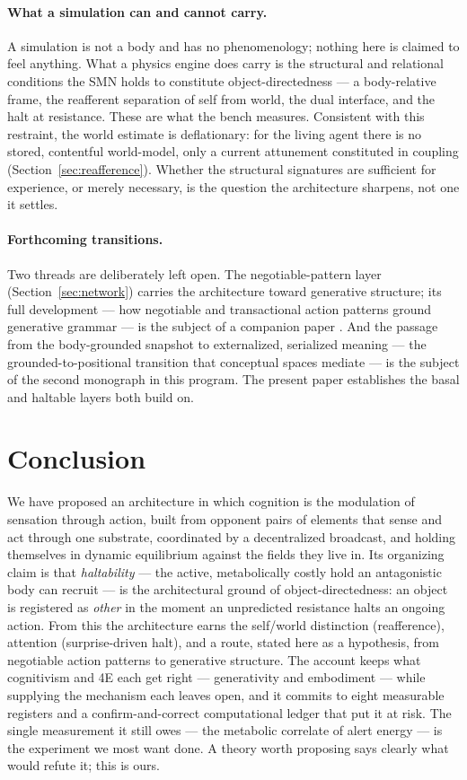 \documentclass[utf8]{FrontiersinHarvard}
\begin{document}
\paragraph{What a simulation can and cannot carry.} A simulation is not a body and has no phenomenology; nothing here is claimed to feel anything. What a physics engine does carry is the structural and relational conditions the SMN holds to constitute object-directedness --- a body-relative frame, the reafferent separation of self from world, the dual interface, and the halt at resistance. These are what the bench measures. Consistent with this restraint, the world estimate is deflationary: for the living agent there is no stored, contentful world-model, only a current attunement constituted in coupling (Section~\ref{sec:reafference}). Whether the structural signatures are sufficient for experience, or merely necessary, is the question the architecture sharpens, not one it settles.

\paragraph{Forthcoming transitions.} Two threads are deliberately left open. The negotiable-pattern layer (Section~\ref{sec:network}) carries the architecture toward generative structure; its full development --- how negotiable and transactional action patterns ground generative grammar --- is the subject of a companion paper \citep{NagarjunaKarnamNAPprep}. And the passage from the body-grounded snapshot to externalized, serialized meaning --- the grounded-to-positional transition that conceptual spaces mediate --- is the subject of the second monograph in this program. The present paper establishes the basal and haltable layers both build on.

\section{Conclusion}\label{sec:conclusion}

We have proposed an architecture in which cognition is the modulation of sensation through action, built from opponent pairs of elements that sense and act through one substrate, coordinated by a decentralized broadcast, and holding themselves in dynamic equilibrium against the fields they live in. Its organizing claim is that \emph{haltability} --- the active, metabolically costly hold an antagonistic body can recruit --- is the architectural ground of object-directedness: an object is registered as \emph{other} in the moment an unpredicted resistance halts an ongoing action. From this the architecture earns the self/world distinction (reafference), attention (surprise-driven halt), and a route, stated here as a hypothesis, from negotiable action patterns to generative structure. The account keeps what cognitivism and 4E each get right --- generativity and embodiment --- while supplying the mechanism each leaves open, and it commits to eight measurable registers and a confirm-and-correct computational ledger that put it at risk. The single measurement it still owes --- the metabolic correlate of alert energy --- is the experiment we most want done. A theory worth proposing says clearly what would refute it; this is ours.
\end{document}

